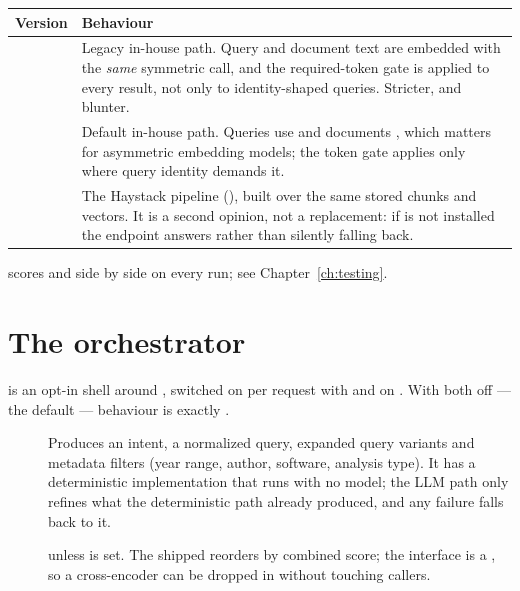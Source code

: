\begin{longtable}{L{0.10\textwidth} L{0.80\textwidth}}
\toprule
\textbf{Version} & \textbf{Behaviour} \\
\midrule
\endfirsthead
\bottomrule
\endfoot
{} & Legacy in-house path. Query and document text are embedded with the
\emph{same} symmetric call, and the required-token gate is applied to every
result, not only to identity-shaped queries. Stricter, and blunter. \\
 & Default in-house path. Queries use  and documents
, which matters for asymmetric embedding models; the token
gate applies only where query identity demands it. \\
 & The Haystack pipeline (), built over
the same stored chunks and vectors. It is a second opinion, not a replacement:
if  is not installed the endpoint answers  rather
than silently falling back. \\
\end{longtable}

 scores  and  side by side on every
run; see Chapter~\ref{ch:testing}.

\section{The orchestrator}

 is an opt-in shell around ,
switched on per request with  and
 on . With both off --- the default ---
behaviour is exactly .

\begin{description}
\item[] Produces an intent, a normalized query,
expanded query variants and metadata filters (year range, author, software,
analysis type). It has a deterministic implementation that runs with no model;
the LLM path only refines what the deterministic path already produced, and any
failure falls back to it.

\item[]  unless  is set.
The shipped  reorders by combined score; the interface is a
, so a cross-encoder can be dropped in without touching callers.
\end{description}

